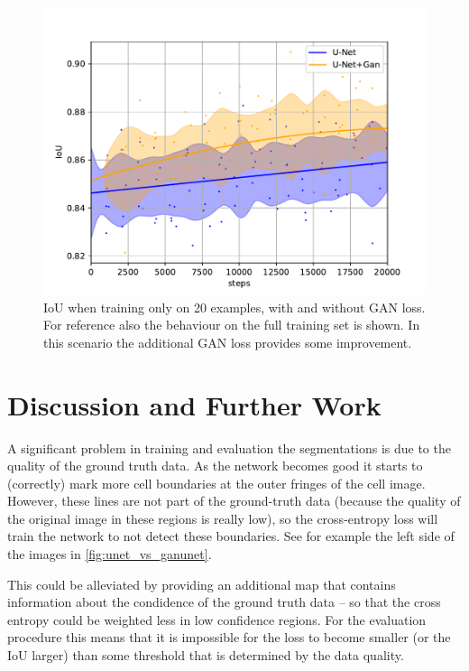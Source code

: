 \documentclass[aps,prl,twocolumn,groupedaddress,amsmath,amssymb]{revtex4-1}
\begin{document}
    \begin{figure}[tbp]
        \begin{center}
        \includegraphics[width=\linewidth]{figures/less_data.pdf}
        \end{center}
        \caption{IoU when training only on 20 examples, with and without GAN loss. For reference
        also the behaviour on the full training set is shown. In this scenario the additional GAN
        loss provides some improvement.}
        \label{fig:reduced_data}
    \end{figure}


    \section{Discussion and Further Work}

    A significant problem in training and evaluation the segmentations is due to the quality of the
    ground truth data. As the network becomes good it starts to (correctly) mark more cell
    boundaries at the outer fringes of the cell image. However, these lines are not part of the
    ground-truth data (because the quality of the original image in these regions is really low), so
    the cross-entropy loss will train the network to not detect these boundaries. See for example
    the left side of the images in \autoref{fig:unet_vs_ganunet}.

    This could be alleviated by providing an additional map that contains information about the
    condidence of the ground truth data -- so that the cross entropy could be weighted less in low
    confidence regions. For the evaluation procedure this means that it is impossible for the loss
    to become smaller (or the IoU larger) than some threshold that is determined by the data
    quality.
\end{document}
